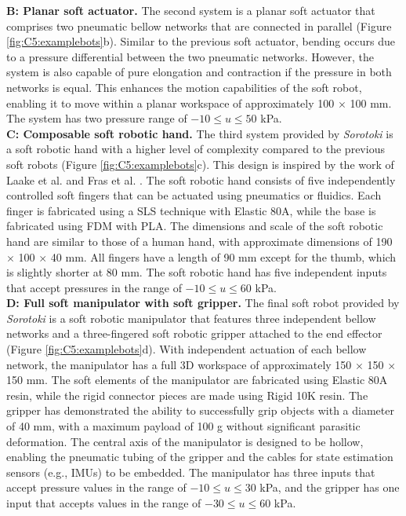 \textbf{B: Planar soft actuator.} The second system is a planar soft actuator that comprises two pneumatic bellow networks that are connected in parallel (Figure \ref{fig:C5:examplebots}b). Similar to the previous soft actuator, bending occurs due to a pressure differential between the two pneumatic networks. However, the system is also capable of pure elongation and contraction if the pressure in both networks is equal. This enhances the motion capabilities of the soft robot, enabling it to move within a planar workspace of approximately 100 $\times$ 100 mm. The system has two pressure range of $-10 \le u \le 50$ kPa. \\

\textbf{C: Composable soft robotic hand.} The third system provided by \textit{Sorotoki} is a soft robotic hand with a higher level of complexity compared to the previous soft robots (Figure \ref{fig:C5:examplebots}c). This design is inspired by the work of Laake et al. \cite{vanLaake2022Sep} and Fras et al. \cite{Fras2018Oct}. The soft robotic hand consists of five independently controlled soft fingers that can be actuated using pneumatics or fluidics. Each finger is fabricated using a SLS technique with Elastic 80A, while the base is fabricated using FDM with PLA. The dimensions and scale of the soft robotic hand are similar to those of a human hand, with approximate dimensions of 190 $\times$ 100 $\times$ 40 mm. All fingers have a length of 90 mm except for the thumb, which is slightly shorter at 80 mm. The soft robotic hand has five independent inputs that accept pressures in the range of $-10 \le u \le 60$ kPa. \\

\textbf{D: Full soft manipulator with soft gripper.}
The final soft robot provided by \textit{Sorotoki} is a soft robotic manipulator that features three independent bellow networks and a three-fingered soft robotic gripper attached to the end effector (Figure \ref{fig:C5:examplebots}d). With independent actuation of each bellow network, the manipulator has a full 3D workspace of approximately 150 $\times$ 150 $\times$ 150 \si{\milli \meter}. The soft elements of the manipulator are fabricated using Elastic 80A resin, while the rigid connector pieces are made using Rigid 10K resin. The gripper has demonstrated the ability to successfully grip objects with a diameter of 40 \si{\milli \meter}, with a maximum payload of 100 \si{\gram} without significant parasitic deformation. The central axis of the manipulator is designed to be hollow, enabling the pneumatic tubing of the gripper and the cables for state estimation sensors (e.g., IMUs) to be embedded. The manipulator has three inputs that accept pressure values in the range of $-10 \le u \le 30$ kPa, and the gripper has one input that accepts values in the range of $-30 \le u \le 60$ kPa. \\

